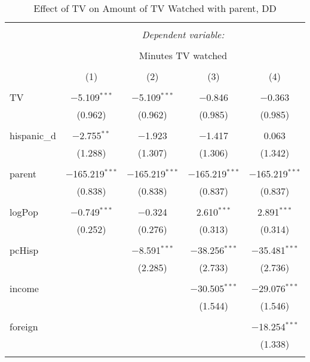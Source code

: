 
\begin{table}[!htbp] \centering 
  \caption{Effect of TV on Amount of TV Watched with parent, DD} 
  \label{} 
\begin{tabular}{@{\extracolsep{-5pt}}lcccc} 
\\[-1.8ex]\hline 
\hline \\[-1.8ex] 
 & \multicolumn{4}{c}{\textit{Dependent variable:}} \\ 
\cline{2-5} 
\\[-1.8ex] & \multicolumn{4}{c}{Minutes TV watched} \\ 
\\[-1.8ex] & (1) & (2) & (3) & (4)\\ 
\hline \\[-1.8ex] 
 TV & $-$5.109$^{***}$ & $-$5.109$^{***}$ & $-$0.846 & $-$0.363 \\ 
  & (0.962) & (0.962) & (0.985) & (0.985) \\ 
  & & & & \\ 
 hispanic\_d & $-$2.755$^{**}$ & $-$1.923 & $-$1.417 & 0.063 \\ 
  & (1.288) & (1.307) & (1.306) & (1.342) \\ 
  & & & & \\ 
 parent & $-$165.219$^{***}$ & $-$165.219$^{***}$ & $-$165.219$^{***}$ & $-$165.219$^{***}$ \\ 
  & (0.838) & (0.838) & (0.837) & (0.837) \\ 
  & & & & \\ 
 logPop & $-$0.749$^{***}$ & $-$0.324 & 2.610$^{***}$ & 2.891$^{***}$ \\ 
  & (0.252) & (0.276) & (0.313) & (0.314) \\ 
  & & & & \\ 
 pcHisp &  & $-$8.591$^{***}$ & $-$38.256$^{***}$ & $-$35.481$^{***}$ \\ 
  &  & (2.285) & (2.733) & (2.736) \\ 
  & & & & \\ 
 income &  &  & $-$30.505$^{***}$ & $-$29.076$^{***}$ \\ 
  &  &  & (1.544) & (1.546) \\ 
  & & & & \\ 
 foreign &  &  &  & $-$18.254$^{***}$ \\ 
  &  &  &  & (1.338) \\ 
  & & & & \\ 

\end{tabular}
\end{table}
